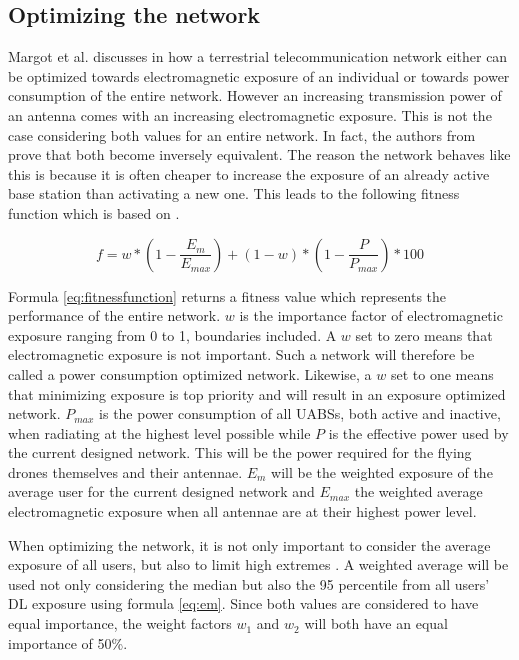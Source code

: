 \documentclass[twocolumn]{phdsymp} %
\begin{document}
\subsection{Optimizing the network}

Margot et al. discusses in \cite{J1} how a terrestrial  telecommunication network either can be optimized towards electromagnetic 
exposure of an individual or towards power consumption of the entire network. 
However an increasing transmission power of an antenna comes with an increasing electromagnetic exposure. This is not the case considering
both values for an entire network. In fact, the authors from \cite{J1}  prove that both become inversely equivalent.
The reason the network behaves like this is because it is often cheaper to increase the exposure of an already active base station 
than activating a new one. 
This leads to the following fitness function which is based on \cite{J1}.

\begin{equation} 
f = w * \left(1 - \frac{E_m}{E_{max}}\right) + (1 - w)*\left(1 - \frac{P}{P_{max}}\right) * 100
\label{eq:fitnessfunction}
\end{equation}

Formula \ref{eq:fitnessfunction} returns a fitness value which represents the performance of the entire network. 
$w$ is the importance factor of electromagnetic exposure ranging from 0 to 1, boundaries included. A $w$ set to zero means that electromagnetic 
exposure is not important. Such a network will therefore be called a power consumption optimized network. 
Likewise, a $w$ set to one means that minimizing exposure is top priority and will result in an exposure optimized network. $P_{max}$ is the power consumption of all UABSs, 
both active and inactive, when radiating at the highest level possible 
while $P$ is the effective power used by the current designed network. 
This will be the power required for the flying drones themselves and their antennae.
$E_m$ will be the weighted exposure of the average user for the current designed network and $E_{max}$ the weighted average electromagnetic exposure when all antennae 
are at their highest power level.

When optimizing the network, it is not only important to consider the average exposure of all users, but also to limit high extremes \cite{J1}. A weighted average 
will be used not only considering the median but also the 95 percentile from all users' \gls{DL} exposure using formula \ref{eq:em}. 
Since both values are considered to have equal importance, the weight factors $w_1$ and $w_2$ will both have an equal importance of 50\%. 
\end{document}
